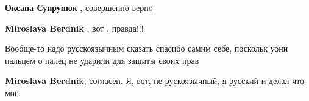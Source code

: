\begin{itemize}
\begin{itemize}
\textbf{Оксана Супрунюк} , совершенно верно

 
\textbf{Miroslava Berdnik} , вот , правда!!!


 
Вообще-то надо русскоязычным сказать спасибо самим себе, поскольк уони пальцем о палец не ударили для защиты своих прав

 
\textbf{Miroslava Berdnik}, согласен. Я, вот, не рускоязычный, я русский и делал что мог.

\end{itemize}

\end{itemize}

